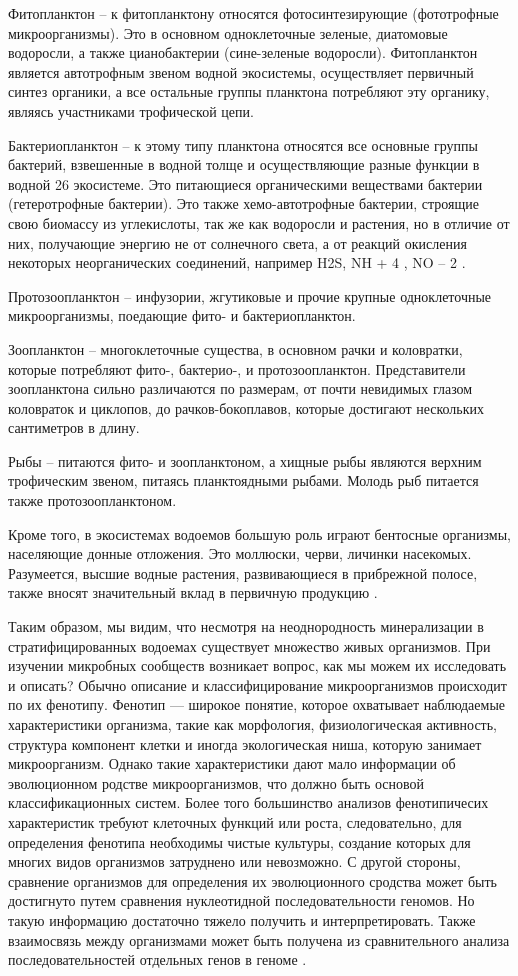 Фитопланктон – к фитопланктону относятся фотосинтезирующие (фототрофные микроорганизмы). Это в основном одноклеточные зеленые, диатомовые водоросли, а также цианобактерии (сине-зеленые водоросли). Фитопланктон является автотрофным звеном водной
экосистемы, осуществляет первичный синтез органики, а все остальные группы планктона
потребляют эту органику, являясь участниками трофической цепи.

Бактериопланктон – к этому типу планктона относятся все основные группы бактерий,
взвешенные в водной толще и осуществляющие разные функции в водной 26 экосистеме.
Это питающиеся органическими веществами бактерии (гетеротрофные бактерии). Это также
хемо-автотрофные бактерии, строящие свою биомассу из углекислоты, так же как водоросли
и растения, но в отличие от них, получающие энергию не от солнечного света, а от реакций
окисления некоторых неорганических соединений, например H2S, NH +
4
, NO –
2
.

Протозоопланктон – инфузории, жгутиковые и прочие крупные одноклеточные микроорганизмы, поедающие фито- и бактериопланктон.

Зоопланктон – многоклеточные существа, в основном рачки и коловратки, которые потребляют фито-, бактерио-, и протозоопланктон. Представители зоопланктона сильно различаются по размерам, от почти невидимых глазом коловраток и циклопов, до рачков-бокоплавов, которые достигают нескольких сантиметров в длину.

Рыбы – питаются фито- и зоопланктоном, а хищные рыбы являются верхним трофическим звеном, питаясь планктоядными рыбами. Молодь рыб питается также протозоопланктоном.

Кроме того, в экосистемах водоемов большую роль играют бентосные организмы, населяющие донные отложения. Это моллюски, черви, личинки насекомых. Разумеется, высшие
водные растения, развивающиеся в прибрежной полосе, также вносят значительный вклад
в первичную продукцию \cite{BioPhys10}.

Таким образом, мы видим, что несмотря на неоднородность минерализации в стратифицированных водоемах существует множество живых организмов. При изучении микробных
сообществ возникает вопрос, как мы можем их исследовать и описать? Обычно описание и
классифицирование микроорганизмов происходит по их фенотипу. Фенотип — широкое понятие, которое охватывает наблюдаемые характеристики организма, такие как морфология,
физиологическая активность, структура компонент клетки и иногда экологическая ниша,
которую занимает микроорганизм. Однако такие характеристики дают мало информации об
эволюционном родстве микроорганизмов, что должно быть основой классификационных систем. Более того большинство анализов фенотипичесих характеристик требуют клеточных
функций или роста, следовательно, для определения фенотипа необходимы чистые культуры, создание которых для многих видов организмов затруднено или невозможно. С другой
стороны, сравнение организмов для определения их эволюционного сродства может быть
достигнуто путем сравнения нуклеотидной последовательности геномов. Но такую информацию достаточно тяжело получить и интерпретировать. Также взаимосвязь между организмами может быть получена из сравнительного анализа последовательностей отдельных
генов в геноме \cite{Hugenholtz1996}.

